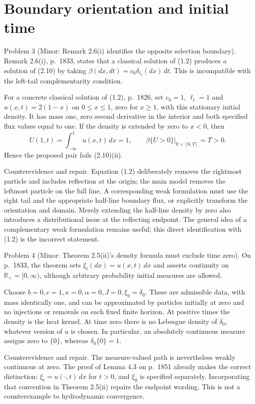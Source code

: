 \documentclass[10pt]{article}
\begin{document}
\section*{Boundary orientation and initial time}
Problem 3 (Minor: Remark 2.6(i) identifies the opposite selection boundary).  Remark 2.6(i), p. 1833, states that a classical solution of (1.2) produces a solution of (2.10) by taking \(\beta(dx,dt)=c_0\delta_{\ell_t}(dx)\,dt\). This is incompatible with the left-tail complementarity condition.\par
For a concrete classical solution of (1.2), p. 1826, set \(c_0=1\), \(\ell_t=1\) and \(u(x,t)=2(1-x)\) on \(0\leq x\leq1\), zero for \(x\geq1\), with this stationary initial density. It has mass one, zero second derivative in the interior and both specified flux values equal to one. If the density is extended by zero to \(x<0\), then \[U(1,t)=\int_{-\infty}^1u(x,t)\,dx=1,\qquad
\beta\{U>0\}\big|_{\mathbb R\times[0,T]}=T>0.\] Hence the proposed pair fails (2.10)(ii).\par
Counterevidence and repair. Equation (1.2) deliberately removes the rightmost particle and includes reflection at the origin; the main model removes the leftmost particle on the full line. A corresponding weak formulation must use the right tail and the appropriate half-line boundary flux, or explicitly transform the orientation and domain. Merely extending the half-line density by zero also introduces a distributional issue at the reflecting endpoint. The general idea of a complementary weak formulation remains useful; this direct identification with (1.2) is the incorrect statement.\par
Problem 4 (Minor: Theorem 2.5(ii)’s density formula must exclude time zero).  On p. 1833, the theorem sets \(\xi_t(dx)=u(x,t)\,dx\) and asserts continuity on \(\mathbb R_+=[0,\infty)\), although arbitrary probability initial measures are allowed.\par
Choose \(b=0,c=1,\kappa=0,\alpha=0,J=0,\xi_0=\delta_0\). These are admissible data, with mass identically one, and can be approximated by particles initially at zero and no injections or removals on each fixed finite horizon. At positive times the density is the heat kernel. At time zero there is no Lebesgue density of \(\delta_0\), whatever version of \(u\) is chosen. In particular, an absolutely continuous measure assigns zero to \(\{0\}\), whereas \(\delta_0\{0\}=1\).\par
Counterevidence and repair. The measure-valued path is nevertheless weakly continuous at zero. The proof of Lemma 4.3 on p. 1851 already makes the correct distinction: \(\xi_t=u(\cdot,t)\,dx\) for \(t>0\), and \(\xi_0\) is specified separately. Incorporating that convention in Theorem 2.5(ii) repairs the endpoint wording. This is not a counterexample to hydrodynamic convergence.\par
\end{document}
